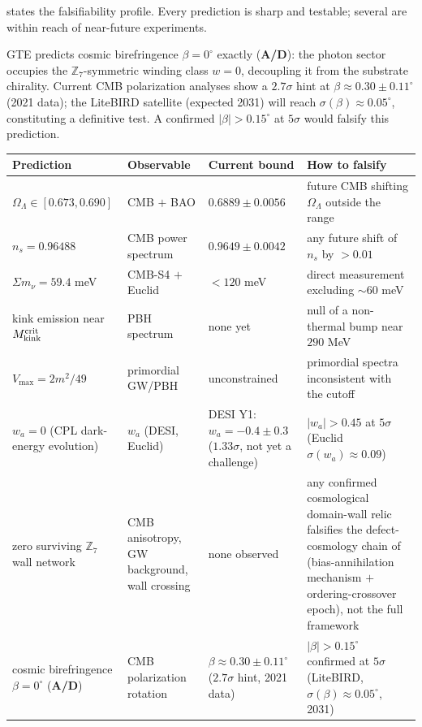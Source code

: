 \documentclass[11pt]{article}
\theoremstyle{remark}
\newcommand{\ZS}{\mathbb{Z}_7}
\newcommand{\Mkink}{M_{\rm kink}}
\newcommand{\OmL}{\Omega_\Lambda}
\newcommand{\ns}{n_s}
\newcommand{\CatAD}{\textbf{A/D}}
\begin{document}
 states the falsifiability profile. Every prediction is sharp and
testable; several are within reach of near-future experiments.

GTE predicts cosmic birefringence $\beta = 0^\circ$ exactly (\CatAD{}): the photon sector
occupies the $\ZS$-symmetric winding class $w=0$, decoupling it from the substrate
chirality. Current CMB polarization analyses show a $2.7\sigma$ hint at $\beta \approx
0.30\pm0.11^\circ$ (2021 data); the LiteBIRD satellite (expected 2031) will reach
$\sigma(\beta)\approx 0.05^\circ$, constituting a definitive test. A confirmed
$|\beta| > 0.15^\circ$ at $5\sigma$ would falsify this prediction.

\begin{table}[h]
\centering
\small
\begin{tabularx}{\textwidth}{@{}P{2.8cm}P{3.0cm}P{3.2cm}Y@{}}
\toprule
\textbf{Prediction} & \textbf{Observable} & \textbf{Current bound} & \textbf{How to falsify} \\
\midrule
$\OmL \in [0.673, 0.690]$ & CMB $+$ BAO & $0.6889\pm0.0056$ & future CMB shifting $\OmL$ outside the range \\
$\ns = 0.96488$ & CMB power spectrum & $0.9649\pm0.0042$ & any future shift of $\ns$ by $>0.01$ \\
$\Sigma m_\nu = 59.4$ meV & CMB-S4 $+$ Euclid & $<120$ meV & direct measurement excluding $\sim 60$ meV \\
kink emission near $\Mkink^{\rm crit}$ & PBH spectrum & none yet & null of a non-thermal bump near $290$ MeV \\
$V_{\max} = 2m^2/49$ & primordial GW/PBH & unconstrained & primordial spectra inconsistent with the cutoff \\
$w_a = 0$ (CPL dark-energy evolution) & $w_a$ (DESI, Euclid) & DESI Y1: $w_a = -0.4\pm0.3$ ($1.33\sigma$, not yet a challenge) & $|w_a|>0.45$ at $5\sigma$ (Euclid $\sigma(w_a)\approx0.09$) \\
zero surviving $\ZS$ wall network & CMB anisotropy, GW background, wall crossing & none observed & any confirmed cosmological domain-wall relic falsifies the defect-cosmology chain of  (bias-annihilation mechanism $+$ ordering-crossover epoch), not the full framework \\
cosmic birefringence $\beta = 0^\circ$ (\CatAD{}) & CMB polarization rotation & $\beta \approx 0.30\pm0.11^\circ$ ($2.7\sigma$ hint, 2021 data) & $|\beta|>0.15^\circ$ confirmed at $5\sigma$ (LiteBIRD, $\sigma(\beta)\approx0.05^\circ$, 2031) \\

\end{tabularx}
\end{table}
\end{document}
